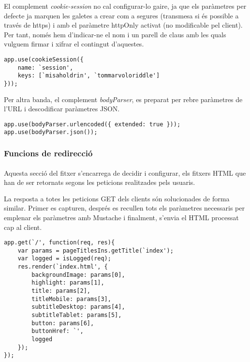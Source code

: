     El complement \emph{cookie-session} no cal configurar-lo gaire, ja que els paràmetres per defecte ja marquen les galetes a crear com a segures (transmesa si és possible a través de https) i amb el paràmetre httpOnly activat (no modificable pel client). Per tant, només hem d'indicar-ne el nom i un parell de claus amb les quals vulguem firmar i xifrar el contingut d'aquestes.

    \begin{lstlisting}[style=rawOwn,caption={Configuració del complement \emph{cookie-session}}]
app.use(cookieSession({
    name: `session',
    keys: [`misaholdrin', `tommarvoloriddle']
}));
    \end{lstlisting}

    Per altra banda, el complement \emph{bodyParser}, es preparat per rebre paràmetres de l'URL i descodificar paràmetres JSON.

    \begin{lstlisting}[style=rawOwn,caption={Configuració del complement \emph{bodyParser}}]
app.use(bodyParser.urlencoded({ extended: true }));
app.use(bodyParser.json());
    \end{lstlisting}


    \subsubsection{Funcions de redirecció}

    \paragraph{}
    Aquesta secció del fitxer s'encarrega de decidir i configurar, els fitxers HTML que han de ser retornats segons les peticions realitzades pels usuaris.

    La resposta a totes les peticions GET dels clients són solucionades de forma similar. Primer es capturen, després es recullen tots els paràmetres necessaris per emplenar els paràmetres amb Mustache i finalment, s'envia el HTML processat cap al client.

    \begin{lstlisting}[style=rawOwn,caption={Respota del servidor davant la petició del recurs `/'}]
app.get(`/', function(req, res){
    var params = pageTitlesIns.getTitle(`index');
    var logged = isLogged(req);
    res.render(`index.html', {
        backgroundImage: params[0],
        highlight: params[1],
        title: params[2],
        titleMobile: params[3],
        subtitleDesktop: params[4],
        subtitleTablet: params[5],
        button: params[6],
        buttonHref: `',
        logged
    });
});
    \end{lstlisting}

